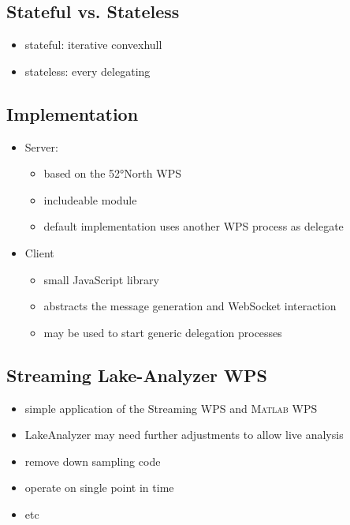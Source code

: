	\subsection{Stateful vs. Stateless}
	\begin{itemize}
		\item stateful: iterative convexhull
		\item stateless: every delegating
	\end{itemize}

	\subsection{Implementation}
	\begin{itemize}
		\item Server:
		\begin{itemize}
			\item based on the 52°North WPS
			\item includeable module
			\item default implementation uses another WPS process as delegate
		\end{itemize}
		\item Client
		\begin{itemize}
			\item small JavaScript library
			\item abstracts the message generation and WebSocket interaction
			\item may be used to start generic delegation processes
		\end{itemize}
	\end{itemize}
	\subsection{Streaming Lake-Analyzer WPS}
	\begin{itemize}
		\item simple application of the Streaming WPS and \textsc{Matlab} WPS
		\item LakeAnalyzer may need further adjustments to allow live analysis
		\item remove down sampling code
		\item operate on single point in time
		\item etc
	\end{itemize}
